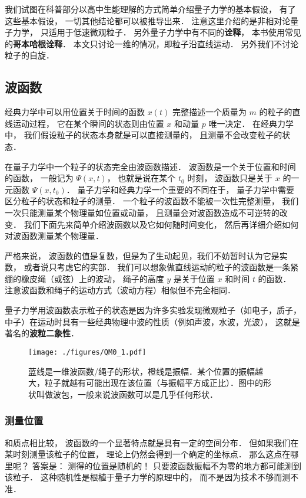 

我们试图在科普部分以高中生能理解的方式简单介绍量子力学的基本假设， 有了这些基本假设， 一切其他结论都可以被推导出来． 注意这里介绍的是非相对论量子力学， 只适用于低速微观粒子． 另外量子力学中有不同的\textbf{诠释}， 本书使用常见的\textbf{哥本哈根诠释}． 本文只讨论一维的情况，即粒子沿直线运动． 另外我们不讨论粒子的自旋．

\subsection{波函数}
经典力学中可以用位置关于时间的函数 $x(t)$ 完整描述一个质量为 $m$ 的粒子的直线运动过程， 它在某个瞬间的状态则由位置 $x$ 和动量 $p$ 唯一决定． 在经典力学中， 我们假设粒子的状态本身就是可以直接测量的， 且测量不会改变粒子的状态．

在量子力学中一个粒子的状态完全由波函数描述． 波函数是一个关于位置和时间的函数， 一般记为 $\Psi(x, t)$， 也就是说在某个 $t_0$ 时刻， 波函数只是关于 $x$ 的一元函数 $\Psi(x, t_0)$． 量子力学和经典力学一个重要的不同在于， 量子力学中需要区分粒子的状态和粒子的测量． 一个粒子的波函数不能被一次性完整测量， 我们一次只能测量某个物理量如位置或动量， 且测量会对波函数造成不可逆转的改变． 我们下面先来简单介绍波函数以及它如何随时间变化， 然后再详细介绍如何对波函数测量某个物理量．

严格来说， 波函数的值是复数，但是为了生动起见，我们不妨暂时认为它是实数， 或者说只考虑它的实部． 我们可以想象做直线运动的粒子的波函数是一条紧绷的橡皮绳（或弦）上的波动， 绳子的高度 $y$ 是关于位置 $x$ 和时间 $t$ 的函数． 注意波函数和绳子的运动方式（波动方程）相似但不完全相同．

量子力学用波函数表示粒子的状态是因为许多实验发现微观粒子（如电子，质子，中子）在运动时具有一些经典物理中波的性质（例如声波，水波，光波）， 这就是著名的\textbf{波粒二象性}．

\begin{figure}[ht]
\centering
\texttt{[image: ./figures/QM0\_1.pdf]}
\caption{蓝线是一维波函数/绳子的形状，橙线是振幅．某个位置的振幅越大，粒子就越有可能出现在该位置（与振幅平方成正比）．图中的形状叫做波包，一般来说波函数可以是几乎任何形状．} \label{QM0_fig1}
\end{figure}

\subsubsection{测量位置}
和质点相比较， 波函数的一个显著特点就是具有一定的空间分布． 但如果我们在某时刻测量该粒子的位置， 理论上仍然会得到一个确定的坐标点． 那么这点在哪里呢？ 答案是： 测得的位置是随机的！ 只要波函数振幅不为零的地方都可能测到该粒子． 这种随机性是根植于量子力学的原理中的， 而不是因为技术不够而测不准．

